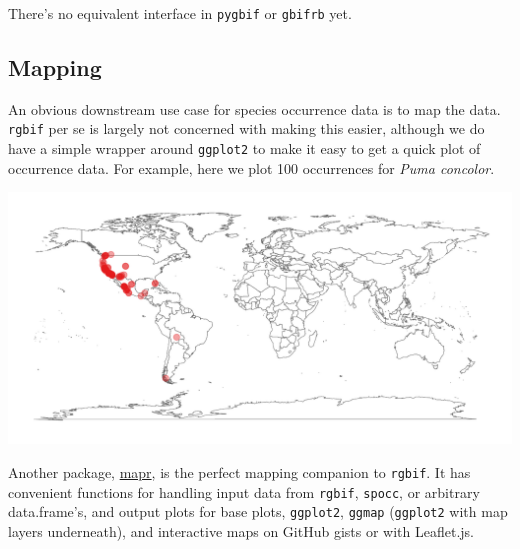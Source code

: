 \documentclass[author-year, review, 11pt]{components/elsarticle} %
\makeatletter
\newenvironment{Shaded}{\begin{snugshade}}{\end{snugshade}}
\newcommand{\KeywordTok}[1]{\textcolor[rgb]{0.13,0.29,0.53}{\textbf{#1}}}
\newcommand{\DataTypeTok}[1]{\textcolor[rgb]{0.13,0.29,0.53}{#1}}
\newcommand{\DecValTok}[1]{\textcolor[rgb]{0.00,0.00,0.81}{#1}}
\newcommand{\StringTok}[1]{\textcolor[rgb]{0.31,0.60,0.02}{#1}}
\newcommand{\OtherTok}[1]{\textcolor[rgb]{0.56,0.35,0.01}{#1}}
\newcommand{\OperatorTok}[1]{\textcolor[rgb]{0.81,0.36,0.00}{\textbf{#1}}}
\newcommand{\NormalTok}[1]{#1}
\def\maxwidth{\ifdim\Gin@nat@width>\linewidth\linewidth
\else\Gin@nat@width\fi}
\let\Oldincludegraphics\includegraphics
\renewcommand{\includegraphics}[1]{\Oldincludegraphics[width=\maxwidth]{#1}}
\makeatother
\begin{document}
There's no equivalent interface in \texttt{pygbif} or \texttt{gbifrb}
yet.

\subsection{Mapping}\label{mapping}

An obvious downstream use case for species occurrence data is to map the
data. \texttt{rgbif} per se is largely not concerned with making this
easier, although we do have a simple wrapper around \texttt{ggplot2} to
make it easy to get a quick plot of occurrence data. For example, here
we plot 100 occurrences for \emph{Puma concolor}.

\begin{Shaded}
\end{Shaded}

\includegraphics{components/figure/manuscript-unnamed-chunk-47-1.pdf}

Another package, \href{https://github.com/ropensci/mapr}{mapr}, is the
perfect mapping companion to \texttt{rgbif}. It has convenient functions
for handling input data from \texttt{rgbif}, \texttt{spocc}, or
arbitrary data.frame's, and output plots for base plots,
\texttt{ggplot2}, \texttt{ggmap} (\texttt{ggplot2} with map layers
underneath), and interactive maps on GitHub gists or with Leaflet.js.
\end{document}
